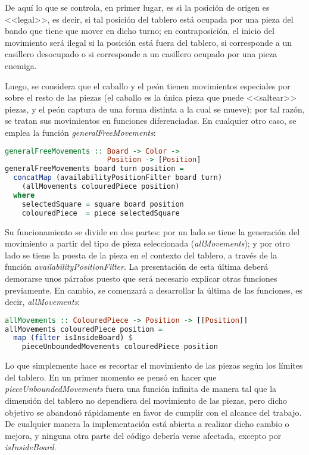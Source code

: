 \documentclass{llncs}
\begin{document}
De aquí lo que se controla, en primer lugar, es si la posición de origen es <<legal>>, es decir, si tal posición del tablero está ocupada por una pieza del bando que tiene que mover en dicho turno; en contraposición, el inicio del movimiento será ilegal si la posición está fuera del tablero, si corresponde a un casillero desocupado o si corresponde a un casillero ocupado por una pieza enemiga.

Luego, se considera que el caballo y el peón tienen movimientos especiales por sobre el resto de las piezas (el caballo es la única pieza que puede <<saltear>> piezas, y el peón captura de una forma distinta a la cual se mueve); por tal razón, se tratan sus movimientos en funciones diferenciadas. En cualquier otro caso, se emplea la función \textit{generalFreeMovements}:


\begin{lstlisting}[frame=single, language=haskell, captionpos=b, caption=Función generalFreeMovements, label={lst:general_free_movements}]
generalFreeMovements :: Board -> Color ->
                        Position -> [Position]
generalFreeMovements board turn position =
  concatMap (availabilityPositionFilter board turn)
    (allMovements colouredPiece position)
  where
    selectedSquare = square board position
    colouredPiece  = piece selectedSquare
\end{lstlisting}

Su funcionamiento se divide en dos partes: por un lado se tiene la generación del movimiento a partir del tipo de pieza seleccionada (\textit{allMovements}); y por otro lado se tiene la puesta de la pieza en el contexto del tablero, a través de la función \textit{availabilityPositionFilter}. La presentación de esta última deberá demorarse unos párrafos puesto que será necesario explicar otras funciones previamente. En cambio, se comenzará a desarrollar la última de las funciones, es decir, \textit{allMovements}:

\begin{lstlisting}[frame=single, language=haskell, captionpos=b, caption=Función allMovements, label={lst:all_movements}]
allMovements :: ColouredPiece -> Position -> [[Position]]
allMovements colouredPiece position =
  map (filter isInsideBoard) $
    pieceUnboundedMovements colouredPiece position
\end{lstlisting}

Lo que simplemente hace es recortar el movimiento de las piezas según los límites del tablero. En un primer momento se pensó en hacer que \textit{pieceUnboundedMovements} fuera una función infinita de manera tal que la dimensión del tablero no dependiera del movimiento de las piezas, pero dicho objetivo se abandonó rápidamente en favor de cumplir con el alcance del trabajo. De cualquier manera la implementación está abierta a realizar dicho cambio o mejora, y ninguna otra parte del código debería verse afectada, excepto por \textit{isInsideBoard}.
\end{document}
